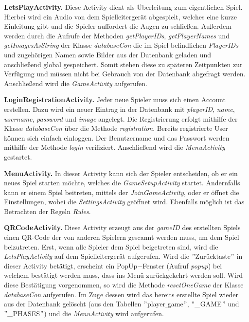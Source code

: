 \documentclass[12pt, a4paper]{article}
\begin{document}
\textbf{LetsPlayActivity.}
Diese Activity dient als Überleitung zum eigentlichen Spiel. Hierbei wird ein Audio von dem Spielleitergerät abgespielt, welches eine kurze Einleitung gibt und die Spieler auffordert die Augen zu schließen. Außerdem werden durch die Aufrufe der Methoden \textit{getPlayerIDs}, \textit{getPlayerNames} und \textit{getImagesAsString} der Klasse \textit{databaseCon} die im Spiel befindlichen \textit{PlayerIDs} und zugehörigen Namen sowie Bilder aus der Datenbank geladen und anschließend global gespeichert. Somit stehen diese zu späteren Zeitpunkten zur Verfügung und müssen nicht bei Gebrauch von der Datenbank abgefragt werden. 
Anschließend wird die \textit{GameActivity} aufgerufen.

\vspace{0,3 cm}      
     
\textbf{LoginRegistrationActivity.}
Jeder neue Spieler muss sich einen Account erstellen. Dazu wird ein neuer Eintrag in der Datenbank mit \textit{playerID}, \textit{name}, \textit{username}, \textit{password} und \textit{image} angelegt. Die Registrierung erfolgt mithilfe der Klasse \textit{databaseCon} über die Methode \textit{registration}. Bereits registrierte User können sich einfach einloggen. Der Benutzername und das Passwort werden mithilfe der Methode \textit{login} verifiziert.
Anschließend wird die \textit{MenuActivity} gestartet.

\vspace{0,3 cm} 
     
\textbf{MenuActivity.}
In dieser Activity kann sich der Spieler entscheiden, ob er ein neues Spiel starten möchte, welches
die \textit{GameSetupActivity} startet.
Andernfalls kann er einem Spiel beitreten, mittels der \textit{JoinGameActivity}, oder er öffnet die Einstellungen, wobei die \textit{SettingsActivity} geöffnet wird.
Ebenfalls möglich ist das Betrachten der Regeln \textit{Rules}.

\vspace{0,3 cm}
      
\textbf{QRCodeActivity.}
Diese Activity erzeugt aus der \textit{gameID} des erstellten Spiels einen QR-Code der von anderen Spielern
gescannt werden muss, um dem Spiel beizutreten. Erst, wenn alle Spieler dem Spiel beigetreten sind,  wird die \textit{LetsPlayActivity} auf dem Spielleitergerät aufgerufen. 
Wird die $"$Zurücktaste$"$ in dieser Activity betätigt, erscheint ein PopUp$-$Fenster (Aufruf \textit{popup}) bei 
welchem bestätigt werden muss, dass ins Menü zurückgekehrt werden soll. Wird diese Bestätigung vorgenommen, 
so wird die Methode \textit{resetOneGame} der Klasse \textit{databaseCon} aufgerufen. Im Zuge dessen wird das bereits erstellte
Spiel wieder aus der Datenbank gelöscht (aus den Tabellen $"$player$\_$game$"$, $"\_$GAME$"$ und $"\_$PHASES$"$) und die \textit{MenuActivity} wird aufgerufen.
\end{document}
